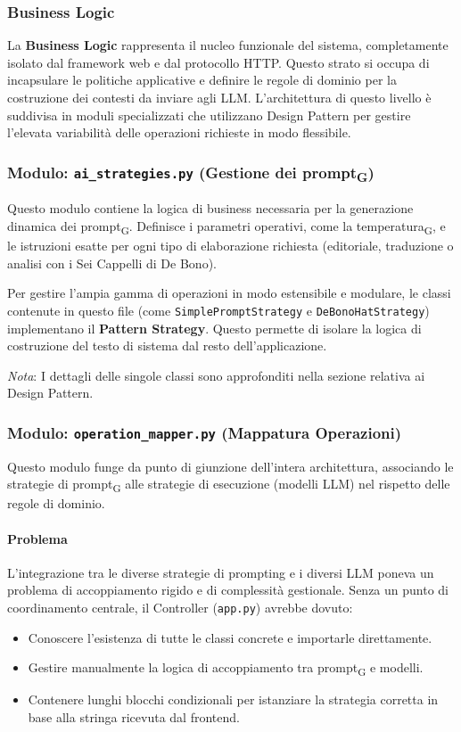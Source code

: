 \documentclass[11pt,a4paper]{article}
\newcommand{\gls}[1]{#1\textsubscript{G}}
\begin{document}
\subsubsection{Business Logic}
La \textbf{Business Logic} rappresenta il nucleo funzionale del sistema, completamente isolato dal framework web e dal protocollo HTTP. Questo strato si occupa di incapsulare le politiche applicative e definire le regole di dominio per la costruzione dei contesti da inviare agli LLM. L'architettura di questo livello è suddivisa in moduli specializzati che utilizzano Design Pattern per gestire l'elevata variabilità delle operazioni richieste in modo flessibile.

\subsubsection{Modulo: \texttt{ai\_strategies.py} (Gestione dei \gls{prompt})}
Questo modulo contiene la logica di business necessaria per la generazione dinamica dei \gls{prompt}. Definisce i parametri operativi, come la \gls{temperatura}, e le istruzioni esatte per ogni tipo di elaborazione richiesta (editoriale, traduzione o analisi con i Sei Cappelli di De Bono). 

Per gestire l'ampia gamma di operazioni in modo estensibile e modulare, le classi contenute in questo file (come \texttt{SimplePromptStrategy} e \texttt{DeBonoHatStrategy}) implementano il \textbf{Pattern Strategy}. Questo permette di isolare la logica di costruzione del testo di sistema dal resto dell'applicazione.

\textit{Nota}: I dettagli delle singole classi sono approfonditi nella sezione relativa ai Design Pattern.

\subsubsection{Modulo: \texttt{operation\_mapper.py} (Mappatura Operazioni)}
Questo modulo funge da punto di giunzione dell'intera architettura, associando le strategie di \gls{prompt} alle strategie di esecuzione (modelli LLM) nel rispetto delle regole di dominio.

\paragraph{Problema}
L’integrazione tra le diverse strategie di prompting e i diversi LLM poneva un problema di accoppiamento rigido e di complessità gestionale. Senza un punto di coordinamento centrale, il Controller (\texttt{app.py}) avrebbe dovuto:
\begin{itemize}
    \item Conoscere l'esistenza di tutte le classi concrete e importarle direttamente.
    \item Gestire manualmente la logica di accoppiamento tra \gls{prompt} e modelli.
    \item Contenere lunghi blocchi condizionali per istanziare la strategia corretta in base alla stringa ricevuta dal frontend.
\end{itemize}
\end{document}
